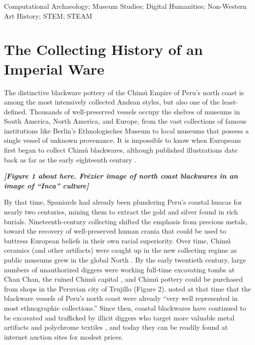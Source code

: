 \documentclass[]{interact}
\theoremstyle{plain}%
\theoremstyle{definition}
\theoremstyle{remark}
\begin{document}
\begin{keywords}
Computational Archaeology; Museum Studies; Digital Humanities;
Non-Western Art History; STEM; STEAM
\end{keywords}

\hypertarget{the-collecting-history-of-an-imperial-ware}{%
\section{The Collecting History of an Imperial
Ware}\label{the-collecting-history-of-an-imperial-ware}}

The distinctive blackware pottery of the Chimú Empire of Peru's north
coast is among the most intensively collected Andean styles, but also
one of the least-defined. Thousands of well-preserved vessels occupy the
shelves of museums in South America, North America, and Europe, from the
vast collections of famous institutions like Berlin's Ethnologisches
Museum to local museums that possess a single vessel of unknown
provenance. It is impossible to know when Europeans first began to
collect Chimú blackwares, although published illustrations date back as
far as the early eighteenth century \citep[Figure 1]{RN11149t}.

\emph{\textbf{{[}Figure 1 about here. Frézier image of north coast
blackwares in an image of ``Inca'' culture{]}}}

By that time, Spaniards had already been plundering Peru's coastal
huacas for nearly two centuries, mining them to extract the gold and
silver found in rich burials. Nineteenth-century collecting shifted the
emphasis from precious metals, toward the recovery of well-preserved
human crania that could be used to buttress European beliefs in their
own racial superiority. Over time, Chimú ceramics (and other artifacts)
were caught up in the new collecting regime as public museums grew in
the global North \citep[50-51]{RN11150}. By the early twentieth century,
large numbers of unauthorized diggers were working full-time excavating
tombs at Chan Chan, the ruined Chimú capital \citep[15]{RN11151}, and
Chimú pottery could be purchased from shops in the Peruvian city of
Trujillo (Figure 2). \citet[570]{RN11152} noted at that time that the
blackware vessels of Peru's north coast were already ``very well
represented in most ethnographic collections.'' Since then, coastal
blackwares have continued to be excavated and trafficked by illicit
diggers who target more valuable metal artifacts and polychrome textiles
\citep{RN11153}, and today they can be readily found at internet auction
sites for modest prices.
\end{document}
